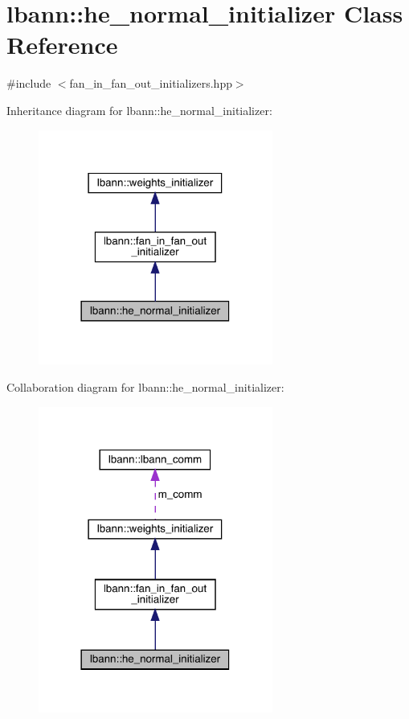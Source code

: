 \hypertarget{classlbann_1_1he__normal__initializer}{}\section{lbann\+:\+:he\+\_\+normal\+\_\+initializer Class Reference}
\label{classlbann_1_1he__normal__initializer}


{\ttfamily \#include $<$fan\+\_\+in\+\_\+fan\+\_\+out\+\_\+initializers.\+hpp$>$}



Inheritance diagram for lbann\+:\+:he\+\_\+normal\+\_\+initializer\+:\nopagebreak
\begin{figure}[H]
\begin{center}
\leavevmode
\includegraphics[width=218pt]{classlbann_1_1he__normal__initializer__inherit__graph}
\end{center}
\end{figure}


Collaboration diagram for lbann\+:\+:he\+\_\+normal\+\_\+initializer\+:\nopagebreak
\begin{figure}[H]
\begin{center}
\leavevmode
\includegraphics[width=218pt]{classlbann_1_1he__normal__initializer__coll__graph}
\end{center}
\end{figure}
